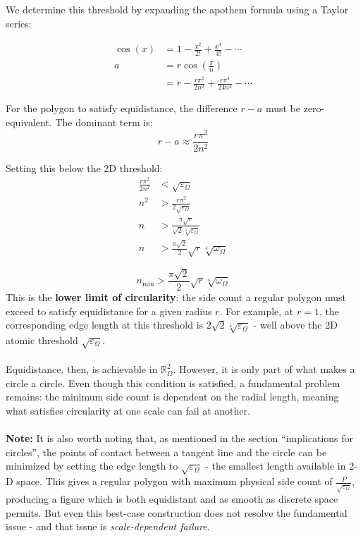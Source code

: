 \documentclass{article}
\begin{document}
We determine this threshold by expanding the apothem formula using a Taylor 
series:

\begin{align*}
\cos(x) &= 1 - \frac{x^2}{2!} + \frac{x^4}{4!} - \cdots \\[0.5em]
a &= r \cos\left(\frac{\pi}{n}\right) \\[0.5em]
&= r - \frac{r\pi^2}{2n^2} + \frac{r\pi^4}{24n^4} - \cdots
\end{align*}

For the polygon to satisfy equidistance, the difference $r - a$ must be 
zero-equivalent. The dominant term is:
$$r - a \approx \frac{r\pi^2}{2n^2}$$

Setting this below the 2D threshold:
\begin{align*}
\frac{r\pi^2}{2n^2} &< \sqrt{\varepsilon_\Omega} \\[0.5em]
n^2 &> \frac{r\pi^2}{2\sqrt{\varepsilon_\Omega}} \\[0.5em]
n &> \frac{\pi\sqrt{r}}{\sqrt{2}\sqrt[4]{\varepsilon_\Omega}} \\[0.5em]
n &> \frac{\pi\sqrt{2}}{2}\sqrt{r}\sqrt[4]{\omega_\Omega}
\end{align*}

$$n_{\text{min}} > \frac{\pi\sqrt{2}}{2}\sqrt{r}\sqrt[4]{\omega_\Omega}$$This is the \textbf{lower limit of circularity}: the side count a regular 
polygon must exceed to satisfy equidistance for a given radius $r$. For 
example, at $r = 1$, the corresponding edge length at this threshold is 
$2\sqrt{2}\sqrt[4]{\varepsilon_\Omega}$ - well above the 2D atomic threshold 
$\sqrt{\varepsilon_\Omega}$.\\\\
Equidistance, then, is achievable in $\mathbb{R}_\Omega^2$. However, it is 
only part of what makes a circle a circle. Even though this condition is 
satisfied, a fundamental problem remains: the minimum side count is dependent 
on the radial length, meaning what satisfies circularity at one scale can fail 
at another.\\\\
\textbf{Note:} It is also worth noting that, as mentioned in the section ``implications for circles'', the 
points of contact between a tangent line and the circle can be minimized by 
setting the edge length to $\sqrt{\varepsilon_\Omega}$ - the smallest length 
available in 2-D space. This gives a regular polygon with maximum physical side count of 
$\frac{P}{\sqrt{\varepsilon_\Omega}}$, producing a figure which is both 
equidistant and as smooth as discrete space permits. But even this best-case 
construction does not resolve the fundamental issue - and that issue is 
\textit{scale-dependent failure}.
\end{document}
